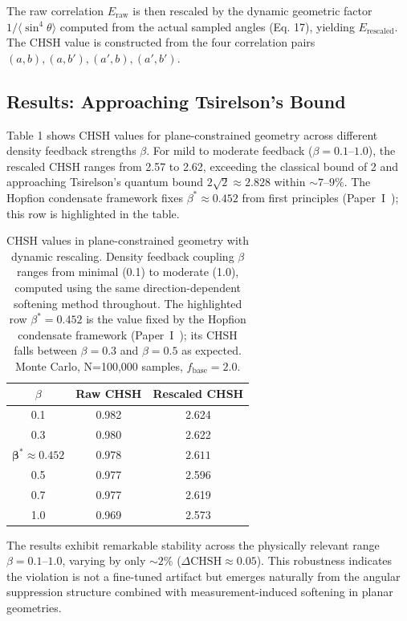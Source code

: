 \documentclass[11pt,a4paper]{article}
\theoremstyle{definition}
\theoremstyle{remark}
\begin{document}
The raw correlation $E_{\mathrm{raw}}$ is then rescaled by the dynamic geometric factor $1/\langle \sin^4\theta \rangle$ computed from the actual sampled angles (Eq. 17), yielding $E_{\mathrm{rescaled}}$. The CHSH value is constructed from the four correlation pairs $(a,b), (a,b'), (a',b), (a',b')$.

\subsection{Results: Approaching Tsirelson's Bound}

Table 1 shows CHSH values for plane-constrained geometry across different density feedback strengths $\beta$. For mild to moderate feedback ($\beta = 0.1$--$1.0$), the rescaled CHSH ranges from 2.57 to 2.62, exceeding the classical bound of 2 and approaching Tsirelson's quantum bound $2\sqrt{2} \approx 2.828$ within $\sim 7$--$9\%$. The Hopfion condensate framework fixes $\beta^* \approx 0.452$ from first principles (Paper~I~\cite{Paper1}); this row is highlighted in the table.

\begin{table}[h]
\centering
\caption{CHSH values in plane-constrained geometry with dynamic rescaling.
Density feedback coupling $\beta$ ranges from minimal (0.1) to moderate (1.0),
computed using the same direction-dependent softening method throughout.
The highlighted row $\beta^* = 0.452$ is the value fixed by the Hopfion
condensate framework (Paper~I~\cite{Paper1}); its CHSH falls between $\beta=0.3$ and
$\beta=0.5$ as expected. Monte Carlo, N=100,000 samples, $f_{\mathrm{base}}=2.0$.}
\label{P8:tab:planar_chsh}
\begin{tabular}{c|c|c}
\hline
$\beta$ & Raw CHSH & Rescaled CHSH \\
\hline
0.1 & 0.982 & 2.624 \\
0.3 & 0.980 & 2.622 \\
$\boldsymbol{\beta^* \approx 0.452}$ & $\mathbf{0.978}$ & $\mathbf{2.611}$ \\
0.5 & 0.977 & 2.596 \\
0.7 & 0.977 & 2.619 \\
1.0 & 0.969 & 2.573 \\
\hline
\end{tabular}
\end{table}

The results exhibit remarkable stability across the physically relevant range $\beta = 0.1$--$1.0$, varying by only $\sim 2\%$ ($\Delta\mathrm{CHSH} \approx 0.05$). This robustness indicates the violation is not a fine-tuned artifact but emerges naturally from the angular suppression structure combined with measurement-induced softening in planar geometries.
\end{document}
